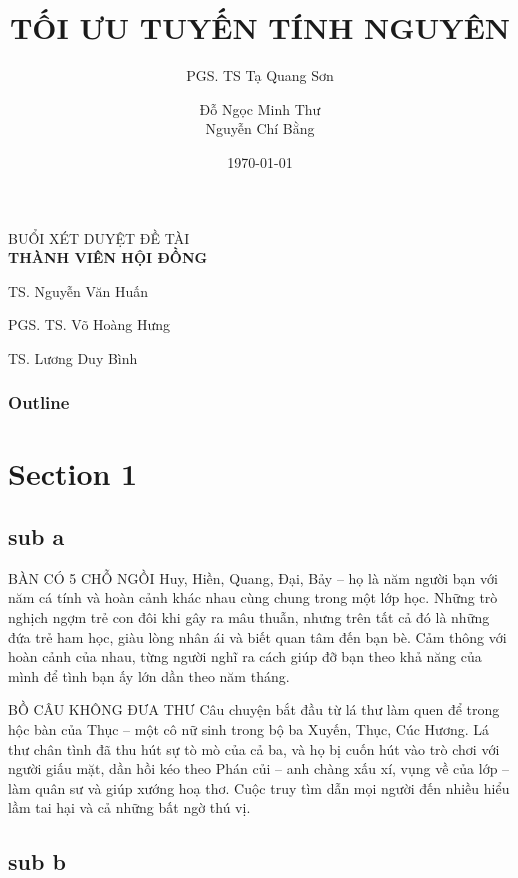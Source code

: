 \documentclass{beamer}
\title{TỐI ƯU TUYẾN TÍNH NGUYÊN}
\subtitle{PGS. TS Tạ Quang Sơn}
\author{Đỗ Ngọc Minh Thư \\ Nguyễn Chí Bằng}
\institute{Khoa Toán Ứng dụng \\ Trường Đại học Sài Gòn}
\date{\today}
\begin{document}
\begin{frame}
\titlepage
\end{frame}

\begin{frame}
\begin{center}
{\huge BUỔI XÉT DUYỆT ĐỀ TÀI}
\\[2\baselineskip]
\textbf{THÀNH VIÊN HỘI ĐỒNG}

TS. Nguyễn Văn Huấn

PGS. TS. Võ Hoàng Hưng

TS. Lương Duy Bình
\end{center}
\end{frame}


\begin{frame}
    \frametitle{Outline}
    \tableofcontents
\end{frame}

\section{Section 1}
\subsection{sub a}

\begin{frame}{BÀN CÓ 5 CHỖ NGỒI}
    Huy, Hiền, Quang, Đại, Bảy – họ là năm người bạn với năm cá tính và hoàn cảnh khác nhau cùng chung trong một lớp học. Những trò nghịch ngợm trẻ con đôi khi gây ra mâu thuẫn, nhưng trên tất cả đó là những đứa trẻ ham học, giàu lòng nhân ái và biết quan tâm đến bạn bè. Cảm thông với hoàn cảnh của nhau, từng người nghĩ ra cách giúp đỡ bạn theo khả năng của mình để tình bạn ấy lớn dần theo năm tháng.
\end{frame}

\begin{frame}{BỒ CÂU KHÔNG ĐƯA THƯ}
    Câu chuyện bắt đầu từ lá thư làm quen để trong hộc bàn của Thục – một cô nữ sinh trong bộ ba Xuyến, Thục, Cúc Hương. Lá thư chân tình đã thu hút sự tò mò của cả ba, và họ bị cuốn hút vào trò chơi với người giấu mặt, dần hồi kéo theo Phán củi – anh chàng xấu xí, vụng về của lớp – làm quân sư và giúp xướng hoạ thơ. Cuộc truy tìm dẫn mọi người đến nhiều hiểu lầm tai hại và cả những bất ngờ thú vị.
\end{frame}

\subsection{sub b}
\end{document}
